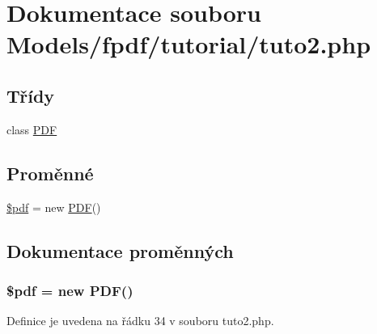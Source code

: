 \hypertarget{tuto2_8php}{\section{Dokumentace souboru Models/fpdf/tutorial/tuto2.php}
\label{tuto2_8php}
}
\subsection*{Třídy}
\begin{DoxyCompactItemize}
\item 
class \hyperlink{class_p_d_f}{P\-D\-F}
\end{DoxyCompactItemize}
\subsection*{Proměnné}
\begin{DoxyCompactItemize}
\item 
\hyperlink{tuto2_8php_a964ee5ee597c515cbb4dad2f14054cb4}{\$pdf} = new \hyperlink{class_p_d_f}{P\-D\-F}()
\end{DoxyCompactItemize}


\subsection{Dokumentace proměnných}
\hypertarget{tuto2_8php_a964ee5ee597c515cbb4dad2f14054cb4}{
\subsubsection[{\$pdf}]{\setlength{\rightskip}{0pt plus 5cm}\$pdf = new {\bf P\-D\-F}()}}\label{tuto2_8php_a964ee5ee597c515cbb4dad2f14054cb4}


Definice je uvedena na řádku 34 v souboru tuto2.\-php.

